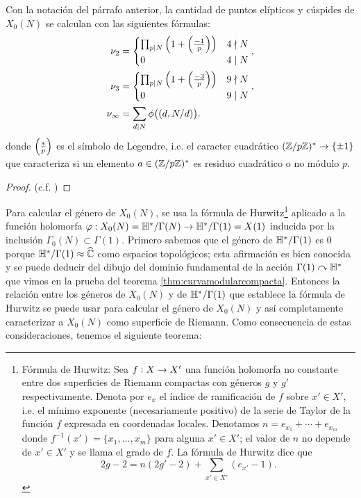 \begin{prop}\label{prop:nui}
  Con la notaci\'on del p\'arrafo anterior, la cantidad de puntos el\'ipticos y c\'uspides de
  $X_0(N)$ se calculan con las siguientes f\'ormulas:
  \begin{align*}
    \nu_2&=
    \begin{cases}
      \prod_{p\mid N}\left( 1+\left(\frac{-1}{p}\right) \right)&4\nmid N\\
      0 & 4\mid N
    \end{cases},\\
    \nu_3&=
    \begin{cases}
      \prod_{p\mid N}\left( 1+\left(\frac{-3}{p}\right) \right)&9\nmid N\\
      0 & 9\mid N
    \end{cases},\\
    \nu_{\infty}&=\sum_{d\mid N}\phi\big((d,N/d)\big).
  \end{align*}
  donde $\left(\frac{*}{p}\right)$ es el s\'imbolo de Legendre, i.e. el caracter cuadr\'atico
  $(\mathbb{Z}/p\mathbb{Z})^*\rightarrow\{\pm1\}$ que caracteriza si un elemento $a\in(\mathbb{Z}/p\mathbb{Z})^*$ es
  residuo cuadr\'atico o no m\'odulo $p$.
\end{prop}
\begin{proof}
  (c.f. \cite[\S1.6, proposici\'on 1.43]{ShimuraITTATOAF})
\end{proof}

Para calcular el g\'enero de $X_0(N)$, se usa la f\'ormula de Hurwitz\footnote{F\'ormula de Hurwitz:
  Sea $f:X\rightarrow X'$ una funci\'on holomorfa no constante entre dos superficies de Riemann compactas con
  g\'eneros $g$ y $g'$ respectivamente. Denota por $e_{x}$ el \'indice de ramificaci\'on de $f$
  sobre $x'\in X'$, i.e. el m\'inimo exponente (necesariamente positivo) de la serie de Taylor de la
  funci\'on $f$ expresada en coordenadas locales. Denotamos $n=e_{x_1}+\cdots+e_{x_m}$ donde
  $f^{-1}(x')=\{x_1,\ldots,x_m\}$ para alguna $x'\in X'$; el valor de $n$ no depende de $x'\in X'$
  y se llama el grado de $f$. La f\'ormula de Hurwitz dice que
  \[
    2g-2=n(2g'-2)+\sum_{x'\in X'}(e_{x'}-1).
  \]
}
aplicado a la funci\'on holomorfa $\varphi:X_0(N)=\mathbb{H}^*/\Gamma(N)\rightarrow\mathbb{H}^*/\Gamma(1)=X(1)$ inducida
por la inclusi\'on
$\Gamma_0(N)\subset\Gamma(1)$. Primero sabemos que el g\'enero de $\mathbb{H}^*/\Gamma(1)$ es 0 porque
$\HH^*/\Gamma(1)\approx\what{\CC}$ como espacios topol\'ogicos; esta afirmaci\'on es bien
conocida y se puede deducir del dibujo del dominio fundamental de la acci\'on
$\Gamma(1)\curvearrowright\mathbb{H}^*$ que vimos en la prueba del teorema \ref{thm:curvamodularcompacta}. Entonces
la relaci\'on entre los g\'eneros de $X_0(N)$ y de $\mathbb{H}^*/\Gamma(1)$ que establece la f\'ormula de
Hurwitz se puede usar para calcular el g\'enero de $X_0(N)$ y as\'i completamente caracterizar
a $X_0(N)$ como superficie de Riemann. Como consecuencia de estas consideraciones, tenemos el
siguiente teorema:

